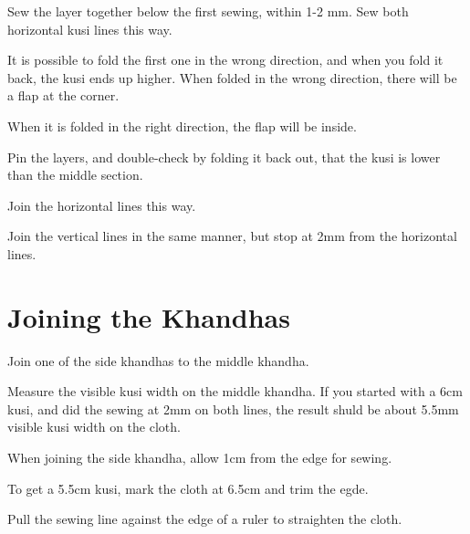 Sew the layer together below the first sewing, within 1-2 mm. Sew both
horizontal kusi lines this way.



It is possible to fold the first one in the wrong direction, and when
you fold it back, the kusi ends up higher. When folded in the wrong
direction, there will be a flap at the corner.

When it is folded in the right direction, the flap will be inside.



Pin the layers, and double-check by folding it back out, that the kusi
is lower than the middle section.

Join the horizontal lines this way.


Join the vertical lines in the same manner, but stop at 2mm from the
horizontal lines.



\section{Joining the Khandhas}

Join one of the side khandhas to the middle khandha.


Measure the visible kusi width on the middle khandha. If you started
with a 6cm kusi, and did the sewing at 2mm on both lines, the result
shuld be about 5.5mm visible kusi width on the cloth.

When joining the side khandha, allow 1cm from the edge for sewing.

To get a 5.5cm kusi, mark the cloth at 6.5cm and trim the egde.


Pull the sewing line against the edge of a ruler to straighten the
cloth.

